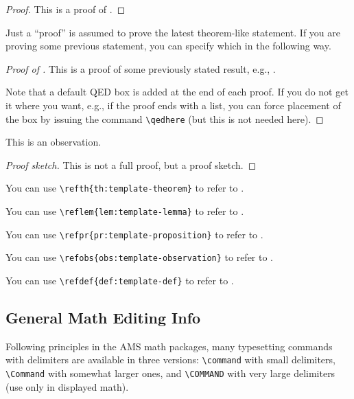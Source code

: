 \begin{proof}
  This is a proof of
  .
\end{proof}

Just a ``proof'' is assumed to prove the latest theorem-like
statement.  If you are proving some previous statement, you can
specify which in the following way.

\begin{proof}[Proof of ]
  This is a proof of some previously stated result, e.g.,
  . 

  Note that a default QED box is added at the end of each proof.
  If you do not get it where you want, e.g., if the proof ends with a
  list,  you can force placement of the box by issuing the command
  \verb+\qedhere+ (but this is not needed here).
\end{proof}

\begin{observation}
  \label{obs:template-observation}
  This is an observation.
\end{observation}

\begin{proof}[Proof sketch]
  This is not a full proof, but a proof sketch.
\end{proof}

You can use
\verb+\refth{th:template-theorem}+
to refer to
.

You can use
\verb+\reflem{lem:template-lemma}+
to refer to
.

You can use
\verb+\refpr{pr:template-proposition}+
to refer to
.

You can use
\verb+\refobs{obs:template-observation}+
to refer to
.

You can use
\verb+\refdef{def:template-def}+
to refer to
.

\subsection{General Math Editing Info}

Following principles in the AMS math packages,
many typesetting commands with delimiters are available in three
versions:
\verb+\command+ with small delimiters,
\verb+\Command+ with somewhat larger ones, and
\verb+\COMMAND+ with very large delimiters (use only in displayed
math).

